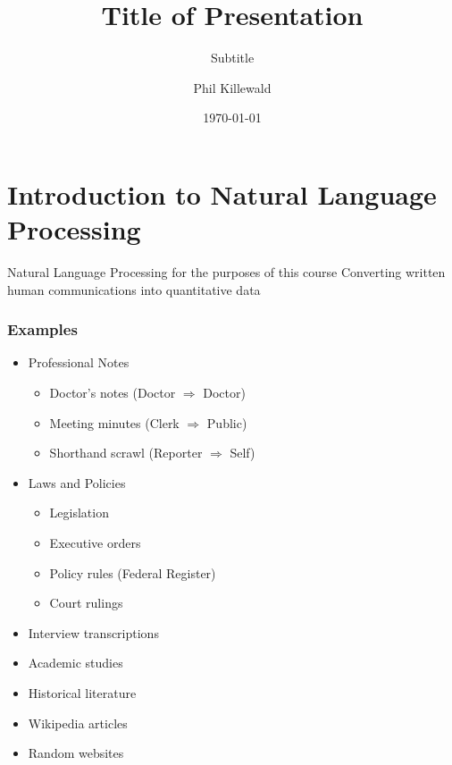 \documentclass[smaller,xcolor=table,aspectratio=169]{beamer}
\title[Short Title]{Title of Presentation}
\subtitle{Subtitle}
\author{Phil Killewald}
\date{\today}
\begin{document}
{%
\logo{\rule{0pt}{\beamerfootheight}}%
\begin{frame}[noframenumbering]%
\titlepage%
\end{frame}%
}



\section{Introduction to Natural Language Processing}

\begin{frame}[plain]
\begin{centering}
  Natural Language Processing
  for the purposes of this course
  Converting written human communications into quantitative data
\end{centering}
\end{frame}

\begin{frame}
  \frametitle{Examples}
  \begin{itemize}
    \item Professional Notes
    \begin{itemize}
      \item Doctor's notes (Doctor \(\Rightarrow\) Doctor)
      \item Meeting minutes (Clerk \(\Rightarrow\) Public)
      \item Shorthand scrawl (Reporter \(\Rightarrow\) Self)
    \end{itemize}
    \item Laws and Policies
    \begin{itemize}
      \item Legislation
      \item Executive orders
      \item Policy rules (Federal Register)
      \item Court rulings
    \end{itemize}
    \item Interview transcriptions
    \item Academic studies
    \item Historical literature
    \item Wikipedia articles
    \item Random websites
  \end{itemize}
\end{frame}
\end{document}
